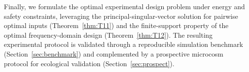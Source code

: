 Finally, we formulate the optimal experimental design problem under energy and safety constraints, leveraging the principal-singular-vector solution for pairwise optimal inputs (Theorem~\ref{thm:T11}) and the finite-support property of the optimal frequency-domain design (Theorem~\ref{thm:T12}).
The resulting experimental protocol is validated through a reproducible simulation benchmark (Section~\ref{sec:benchmark}) and complemented by a prospective microcosm protocol for ecological validation (Section~\ref{sec:prospect}).
